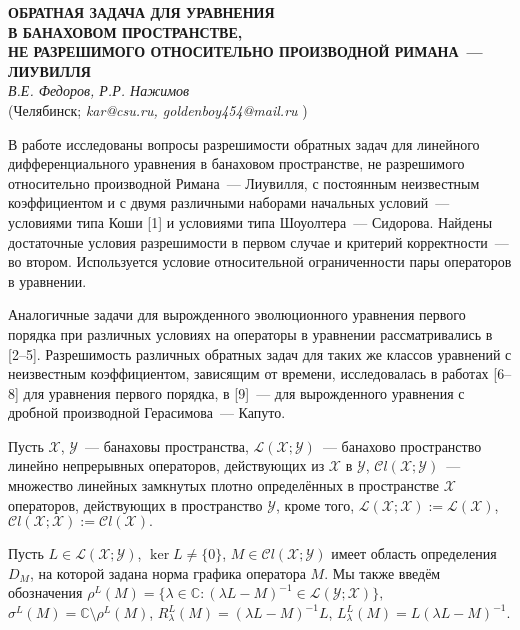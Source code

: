 \begin{center}{ \bf  ОБРАТНАЯ ЗАДАЧА ДЛЯ  УРАВНЕНИЯ\\ В БАНАХОВОМ ПРОСТРАНСТВЕ,\\ НЕ РАЗРЕШИМОГО ОТНОСИТЕЛЬНО ПРОИЗВОДНОЙ РИМАНА~--- ЛИУВИЛЛЯ}\\
{\it В.Е. Федоров, Р.Р. Нажимов } \\
(Челябинск; {\it kar@csu.ru, goldenboy454@mail.ru} )
\end{center}

В работе исследованы вопросы  разрешимости обратных задач для линейного дифференциального уравнения в банаховом пространстве, не разрешимого относительно производной Римана~--- Лиувилля, с постоянным неизвестным коэффициентом и с двумя различными наборами начальных условий~--- условиями типа Коши [1] и условиями типа Шоуолтера~--- Сидорова. Найдены достаточные условия разрешимости в первом случае и критерий корректности~--- во втором. Используется условие относительной ограниченности пары операторов в уравнении.

Аналогичные задачи для вырожденного эволюционного уравнения первого порядка при различных условиях на операторы в уравнении рассматривались в [2--5]. Разрешимость различных обратных задач для таких же классов уравнений с неизвестным коэффициентом, зависящим от времени, исследовалась в работах [6--8] для уравнения первого порядка, в [9]~--- для вырожденного уравнения с дробной производной Герасимова~--- Капуто.

Пусть ${\mathcal  X}$, ${\mathcal  Y}$~--- банаховы пространства, ${\mathcal L}(\mathcal X; \mathcal Y)$~--- банахово пространство линейно непрерывных операторов, действующих из $\mathcal X$ в $\mathcal Y$,
${\mathcal C}l({ \mathcal X; \mathcal Y})$~--- множество линейных замкнутых плотно определённых в пространстве ${\mathcal X}$ операторов, действующих в пространство ${\mathcal Y}$, кроме того,
 ${\mathcal L}(\mathcal X; \mathcal X):={\mathcal L}(\mathcal X)$,  ${\mathcal C}l(\mathcal X;\mathcal X):={\mathcal C}l(\mathcal X).$

Пусть
$L\in{\mathcal  L}({\mathcal  X};{\mathcal  Y})$, $\ker L\ne\{0\}$, $M\in{\mathcal  C}l({\mathcal  X;\mathcal Y})$ имеет область определения $D_M$, на которой задана норма графика оператора $M$. Мы также введём обозначения $\rho^L(M)=\{\lambda\in\mathbb C:
(\lambda L-M)^{-1}\in{\mathcal  L(\mathcal Y;\mathcal X)}\},$ $\sigma^L(M)=\mathbb C\setminus\rho^L(M)$,  $R_\lambda^L(M)=(\lambda L-M)^{-1}L$, $L_\lambda^L(M)=L(\lambda L-M)^{-1}.$

